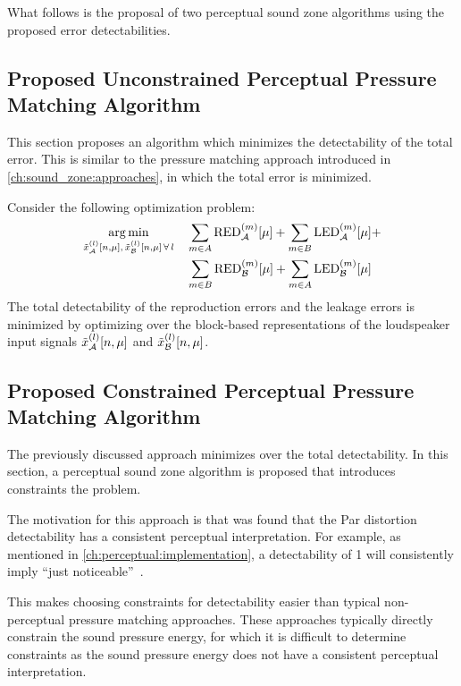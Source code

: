 What follows is the proposal of two perceptual sound zone algorithms using the proposed error detectabilities.

\subsection{Proposed Unconstrained Perceptual Pressure Matching Algorithm}
This section proposes an algorithm which minimizes the detectability of the total error.
This is similar to the pressure matching approach introduced in \autoref{ch:sound_zone:approaches}, 
in which the total error is minimized.

Consider the following optimization problem:
\begin{equation}
    \begin{aligned}
    \argmin{\tilde{x}_\za^{(l)}[n,\mu],\,\tilde{x}_\zb^{(l)}[n,\mu]\,\forall\,l}{
       & \sum_{m\in A}\text{RED}_\za^{(m)}[\mu] + \sum_{m\in B}\text{LED}_\za^{(m)}[\mu] +\\
       & \sum_{m\in B}\text{RED}_\zb^{(m)}[\mu] + \sum_{m\in A}\text{LED}_\zb^{(m)}[\mu]
    }
    \end{aligned}
\end{equation}
The total detectability of the reproduction errors and the leakage errors is minimized by optimizing over the 
block-based representations of the loudspeaker input signals $\tilde{x}_{\mathcal{A}}^{(l)}[n,\mu]$ and $\tilde{x}_{\mathcal{B}}^{(l)}[n,\mu]$.

\subsection{Proposed Constrained Perceptual Pressure Matching Algorithm}
The previously discussed approach minimizes over the total detectability.
In this section, a perceptual sound zone algorithm is proposed that introduces constraints the problem. 

The motivation for this approach is that was found that the Par distortion detectability has a consistent perceptual interpretation.
For example, as mentioned in \autoref{ch:perceptual:implementation}, a detectability of 1 will consistently imply ``just noticeable''~\cite{van2005perceptual}.

This makes choosing constraints for detectability easier than typical non-perceptual pressure matching approaches.
These approaches typically directly constrain the sound pressure energy,
for which it is difficult to determine constraints as the sound pressure energy does not have a consistent perceptual interpretation.

